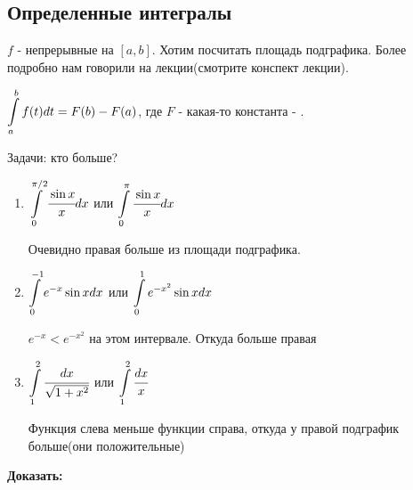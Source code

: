 \subsection{Определенные интегралы}

$f$ - непрерывные на $[a,b]$. Хотим посчитать площадь подграфика. Более подробно нам говорили на лекции(смотрите конспект лекции).

$\displaystyle\int\limits_{a}^{b} f(t)dt = F(b) - F(a)$, где $F$ - какая-то константа - .

Задачи: кто больше?

\begin{enumerate}
    \item $\displaystyle\int\limits_{0}^{\pi/2}\cfrac{\sin x }{x}dx$ или $\displaystyle\int\limits_{0}^{\pi}\cfrac{\sin x}{ x}dx$

    Очевидно правая больше из площади подграфика.
    
    \item $\displaystyle\int\limits_{0}^{-1}e^{-x}\sin x dx$ или $\displaystyle\int\limits_{0}^{1}e^{-x^2}\sin x dx$

    $e^{-x}<e^{-x^2}$ на этом интервале. Откуда больше правая
    
    \item $\displaystyle\int\limits_{1}^{2}\cfrac{dx}{\sqrt{1+x^2}}$ или $\displaystyle\int\limits_{1}^{2} \cfrac{dx}{x}$

    Функция слева меньше функции справа, откуда у правой подграфик больше(они положительные)
\end{enumerate}

\textbf{Доказать:}

